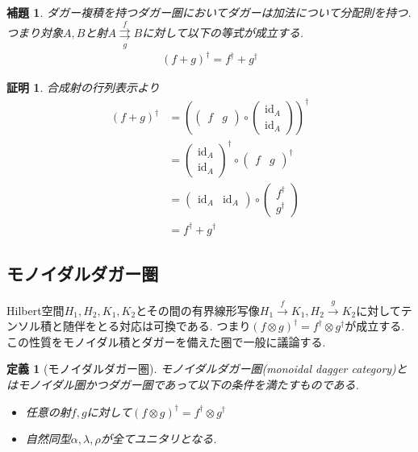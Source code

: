 \documentclass[a4paper,12pt]{ltjsarticle}
\theoremstyle{break}
\newtheorem{defn}[thm]{定義}
\newtheorem{lem}[thm]{補題}
\newtheorem*{prf}{証明}
\newcommand{\xr}[1]{\xrightarrow{#1}}
\newcommand{\id}{\mathrm{id}}
\newcommand{\ci}{\circ}
\newcommand{\al}{\alpha}
\newcommand{\la}{\lambda}
\newcommand{\da}{\dagger}
\newcommand{\ot}{\otimes}
\numberwithin{equation}{section}
\begin{document}
\begin{lem}
  ダガー複積を持つダガー圏においてダガーは加法について分配則を持つ. 
  つまり対象$A,B$と射$A \overset{f}{\underset{g}{\rightrightarrows}} B$に対して以下の等式が成立する.
  \begin{align*}
    (f+g)^\da = f^\da + g^\da
  \end{align*}
\end{lem}

\begin{prf}
  合成射の行列表示より
  \begin{align*}
    (f+g)^\da
    &= \left( 
      \begin{pmatrix}
      f & g
    \end{pmatrix} \ci 
    \begin{pmatrix}
      \id_A \\
      \id_A
    \end{pmatrix}\right)^\da \\
    &= \begin{pmatrix}
      \id_A \\
      \id_A
    \end{pmatrix}^\da
    \ci \begin{pmatrix}
      f & g
    \end{pmatrix}^\da \\
    &= \begin{pmatrix}
      \id_A & \id_A
    \end{pmatrix} \ci 
    \begin{pmatrix}
      f^\da \\
      g^\da
    \end{pmatrix} \\
    &= f^\da + g^\da
  \end{align*}
\end{prf}

\subsection{モノイダルダガー圏}

Hilbert空間$H_1,H_2,K_1,K_2$とその間の有界線形写像$H_1 \xr{f} K_1, H_2 \xr{g} K_2$に対してテンソル積と随伴をとる対応は可換である. 
つまり$(f \ot g)^\da = f^\da \ot g^\da$が成立する. 
この性質をモノイダル積とダガーを備えた圏で一般に議論する. 

\begin{defn}[モノイダルダガー圏]
  モノイダルダガー圏(monoidal dagger category)とはモノイダル圏かつダガー圏であって以下の条件を満たすものである. 
  \begin{itemize}
    \item 任意の射$f,g$に対して$(f \ot g)^\da = f^\da \ot g^\da$
    \item 自然同型$\al, \la, \rho$が全てユニタリとなる. 
  \end{itemize}
\end{defn}
\end{document}
